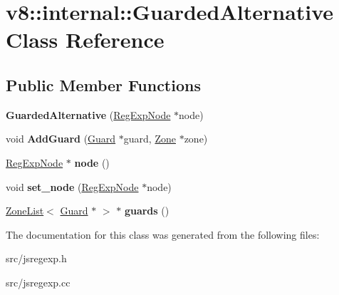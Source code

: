 \hypertarget{classv8_1_1internal_1_1_guarded_alternative}{}\section{v8\+:\+:internal\+:\+:Guarded\+Alternative Class Reference}
\label{classv8_1_1internal_1_1_guarded_alternative}
\subsection*{Public Member Functions}
\begin{DoxyCompactItemize}
\item 
\hypertarget{classv8_1_1internal_1_1_guarded_alternative_a9301c0773fc8f7eb8d3672ac455fef8d}{}{\bfseries Guarded\+Alternative} (\hyperlink{classv8_1_1internal_1_1_reg_exp_node}{Reg\+Exp\+Node} $\ast$node)\label{classv8_1_1internal_1_1_guarded_alternative_a9301c0773fc8f7eb8d3672ac455fef8d}

\item 
\hypertarget{classv8_1_1internal_1_1_guarded_alternative_a3434f11f5f3088a4398a455795c4d316}{}void {\bfseries Add\+Guard} (\hyperlink{classv8_1_1internal_1_1_guard}{Guard} $\ast$guard, \hyperlink{classv8_1_1internal_1_1_zone}{Zone} $\ast$zone)\label{classv8_1_1internal_1_1_guarded_alternative_a3434f11f5f3088a4398a455795c4d316}

\item 
\hypertarget{classv8_1_1internal_1_1_guarded_alternative_a19067cf32a9fe1de6d6b9e4ceb08592c}{}\hyperlink{classv8_1_1internal_1_1_reg_exp_node}{Reg\+Exp\+Node} $\ast$ {\bfseries node} ()\label{classv8_1_1internal_1_1_guarded_alternative_a19067cf32a9fe1de6d6b9e4ceb08592c}

\item 
\hypertarget{classv8_1_1internal_1_1_guarded_alternative_a44d556e4c3f0aaa9ebb23d57ec638409}{}void {\bfseries set\+\_\+node} (\hyperlink{classv8_1_1internal_1_1_reg_exp_node}{Reg\+Exp\+Node} $\ast$node)\label{classv8_1_1internal_1_1_guarded_alternative_a44d556e4c3f0aaa9ebb23d57ec638409}

\item 
\hypertarget{classv8_1_1internal_1_1_guarded_alternative_ace77bbc81d1cfb1c9b1dd9f71f98c7e6}{}\hyperlink{classv8_1_1internal_1_1_zone_list}{Zone\+List}$<$ \hyperlink{classv8_1_1internal_1_1_guard}{Guard} $\ast$ $>$ $\ast$ {\bfseries guards} ()\label{classv8_1_1internal_1_1_guarded_alternative_ace77bbc81d1cfb1c9b1dd9f71f98c7e6}

\end{DoxyCompactItemize}


The documentation for this class was generated from the following files\+:\begin{DoxyCompactItemize}
\item 
src/jsregexp.\+h\item 
src/jsregexp.\+cc\end{DoxyCompactItemize}
